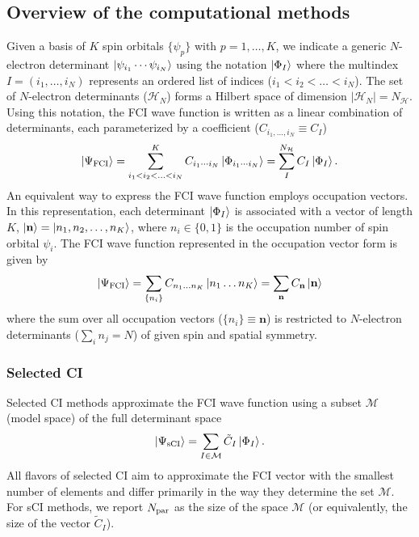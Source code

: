 \documentclass[aip,jcp,amsmath,amssymb, preprint]{revtex4-1}
\newcommand*{\nfci}{N_\mathcal{H}}
\begin{document}
\subsection{Overview of the computational methods}
Given a basis of $K$ spin orbitals $\{\psi_p\}$ with $p = 1,\ldots,K$, we indicate a generic $N$-electron determinant $\ket{\psi_{i_1}\cdots\psi_{i_N}}$ using the notation $\ket{\Phi_I}$ where the multindex $I = (i_1,\ldots,i_N)$ represents an ordered list of indices ($i_1 < i_2 < \ldots < i_N$).
The set of $N$-electron determinants ($\mathcal{H}_N$) forms a Hilbert space of dimension $|\mathcal{H}_N| = \nfci$.
Using this notation, the FCI wave function is written as a linear combination of determinants, each parameterized by a coefficient ($C_{i_1,\ldots,i_N} \equiv C_{I} $)
\begin{equation}
\ket{\Psi_{\text{FCI}}} = \sum_{i_1 < i_2 < \ldots < i_N}^{K} C_{i_1 \cdots i_N} \ket{\Phi_{i_1 \cdots i_N}}  = \sum_{I}^{\nfci} C_{I} \ket{\Phi_{I}} 
\label{eq:fci_def1}.
\end{equation}
An equivalent way to express the FCI wave function employs occupation vectors.
In this representation, each determinant $\ket{\Phi_I}$ is associated with a vector of length $K$, $\ket{\mathbf{n}} =\ket{n_1, n_2, \ldots, n_K}$, where $n_i \in \{0,1\}$ is the occupation number of spin orbital $\psi_i$.
The FCI wave function represented in the occupation vector form is given by
\begin{equation}
\ket{\Psi_{\text{FCI}}}  = \sum_{\{  n_{i}\}} C_{n_{1} \ldots n_{K}} \ket{n_{1} \ldots n_{K}}
= \sum_{\mathbf{n}} C_{\mathbf{n}} \ket{\mathbf{n}}
\end{equation}
where the sum over all occupation vectors ($\{  n_{i}\} \equiv \mathbf{n}$) is restricted to $N$-electron determinants ($\sum_i n_j = N$) of given spin and spatial symmetry.

\subsubsection{Selected CI}
\label{sec:SCI}

Selected CI methods approximate the FCI wave function using a subset $\mathcal{M}$ (model space) of the full determinant space
\begin{equation}
\ket{\Psi_\mathrm{sCI}} = \sum_{I \in \mathcal{M}} \tilde{C}_I \ket{\Phi_I}.
\end{equation}
All flavors of selected CI aim to approximate the FCI vector with the smallest number of elements and differ primarily in the way they determine the set $\mathcal{M}$.
For sCI methods, we report $N_{\rm{par}}$ as the size of the space $\mathcal{M}$ (or equivalently, the size of the vector $\tilde{C}_I$).
\end{document}
